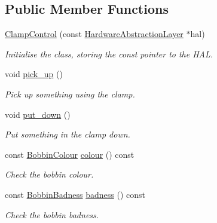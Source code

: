 \subsection*{Public Member Functions}
\begin{DoxyCompactItemize}
\item 
\hyperlink{classIDP_1_1ClampControl_a86666dd07720e41ba549edc9cc06d72a}{ClampControl} (const \hyperlink{classIDP_1_1HardwareAbstractionLayer}{HardwareAbstractionLayer} $\ast$hal)
\begin{DoxyCompactList}\small\item\em Initialise the class, storing the const pointer to the HAL. \item\end{DoxyCompactList}\item 
void \hyperlink{classIDP_1_1ClampControl_a881ecc4fbc73c47594ecc675b9dbf3e1}{pick\_\-up} ()
\begin{DoxyCompactList}\small\item\em Pick up something using the clamp. \item\end{DoxyCompactList}\item 
void \hyperlink{classIDP_1_1ClampControl_a31573846d9f7c61a6133b9dd465eca25}{put\_\-down} ()
\begin{DoxyCompactList}\small\item\em Put something in the clamp down. \item\end{DoxyCompactList}\item 
const \hyperlink{namespaceIDP_a6efd2cca14c0dae1c6458714ce0218df}{BobbinColour} \hyperlink{classIDP_1_1ClampControl_a99cb7006d4265ea369124786625281c9}{colour} () const 
\begin{DoxyCompactList}\small\item\em Check the bobbin colour. \item\end{DoxyCompactList}\item 
const \hyperlink{namespaceIDP_adf12b2c1e1c228810b18c34a3c88c32d}{BobbinBadness} \hyperlink{classIDP_1_1ClampControl_a6b829dbdee269f7fc3a99b2bd0bb379c}{badness} () const 
\begin{DoxyCompactList}\small\item\em Check the bobbin badness. \item\end{DoxyCompactList}\end{DoxyCompactItemize}


